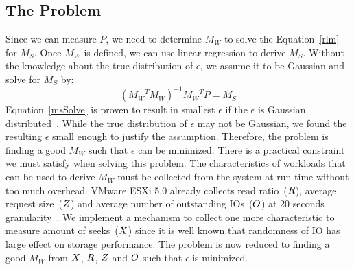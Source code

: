 \subsection{The Problem}
Since we can measure $P$, we need to determine $M_W$ to solve the Equation~\ref{rlm} for $M_S$.
Once $M_W$ is defined, we can use linear regression to derive $M_S$.
Without the knowledge about the true distribution of $\epsilon$, we assume it to be Gaussian and solve for $M_S$ by:
\begin{equation}\label{msSolve}
({M_W}^TM_W)^{-1}{M_W}^TP = M_S
\end{equation}
Equation~\ref{msSolve} is proven to result in smallest $\epsilon$ if the $\epsilon$ is Gaussian distributed~\cite{hayashi:2000}.
While the true distribution of $\epsilon$ may not be Gaussian, we found the resulting $\epsilon$ small enough to justify the assumption.
Therefore, the problem is finding a good $M_W$ such that $\epsilon$ can be minimized.
There is a practical constraint we must satisfy when solving this problem.
The characteristics of workloads that can be used to derive $M_W$ must be collected from the system at run time without too much overhead.
VMware ESXi 5.0 already collects read ratio~($R$), average request size~($Z$) and average number of outstanding IOs~($O$) at 20 seconds granularity~\cite{vmware:2006}.
We implement a mechanism to collect one more characteristic to measure amount of seeks~($X$) since it is well known that randomness of IO has large effect on storage performance.
The problem is now reduced to finding a good $M_W$ from $X$, $R$, $Z$ and $O$ such that $\epsilon$ is minimized.

